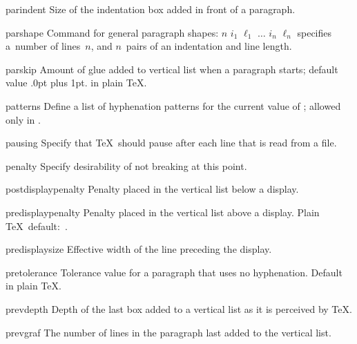 \item parindent
      Size of the indentation box added in front of a paragraph.

\item parshape
      Command for general paragraph shapes: 
      \disp{}$n$ $i_1$ $\ell_1$ $\ldots$
                $i_n$ $\ell_n$\>
      specifies a~number
      of lines~$n$, and $n$~pairs of an indentation and
      line length.

\item parskip
      Amount of glue added to vertical list when a paragraph starts; 
      default value \ver.0pt plus 1pt. in plain \TeX.

\item patterns
      Define a list of hyphenation patterns for the current
      value of ;  allowed only in \IniTeX.

\item pausing
      Specify that \TeX\ should pause after each line that is 
      read from a file.

\item penalty
      Specify desirability of not breaking at this point.

\item postdisplaypenalty
      Penalty placed in the vertical list below a display.

\item predisplaypenalty
      Penalty placed in the vertical list above a display.
      Plain \TeX\ default:~.

\item predisplaysize
      Effective width of the line preceding the display.

\item pretolerance
      Tolerance value for a paragraph that uses no hyphenation. 
      Default~ in plain \TeX.

\item prevdepth 
      Depth of the last box added to a vertical list as it is 
      perceived by \TeX.

\item prevgraf 
      The number of lines in the paragraph last
      added to the vertical list.

